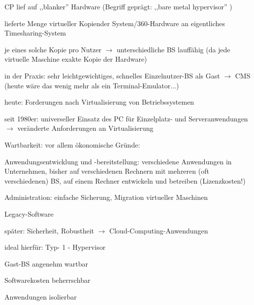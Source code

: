 \documentclass[a4paper]{article}
\newcommand{\cmark}{\ding{51}}
\begin{document}
\begin{multicols}{3}
\begin{itemize*}
\begin{itemize*}
            \item CP lief auf ,,blanker'' Hardware (Begriff geprägt: ,,bare metal hypervisor'' ) \begin{itemize*} \item   lieferte Menge virtueller Kopiender System/360-Hardware an   eigentliches Timesharing-System \item   je eines solche Kopie pro Nutzer $\rightarrow$    unterschiedliche BS lauffähig (da jede virtuelle Maschine exakte   Kopie der Hardware) \item   in der Praxis: sehr leichtgewichtiges, schnelles Einzelnutzer-BS   als Gast $\rightarrow$  CMS (heute wäre das wenig   mehr als ein Terminal-Emulator...) \end{itemize*}
        \end{itemize*}
        \item
        heute: Forderungen nach Virtualisierung von Betriebssystemen
        \begin{itemize*}
            \item seit 1980er: universeller Einsatz des PC für Einzelplatz- und Serveranwendungen $\rightarrow$  veränderte Anforderungen an Virtualisierung
            \item Wartbarkeit: vor allem ökonomische Gründe: \begin{enumerate*}  \item   Anwendungsentwicklung und -bereitstellung: verschiedene   Anwendungen in Unternehmen, bisher auf verschiedenen Rechnern mit   mehreren (oft verschiedenen) BS, auf einem Rechner entwickeln und   betreiben (Lizenzkosten!) \item   Administration: einfache Sicherung, Migration virtueller Maschinen \item   Legacy-Software \end{enumerate*}
            \item später: Sicherheit, Robustheit $\rightarrow$  Cloud-Computing-Anwendungen
        \end{itemize*}
        \item
        ideal hierfür: Typ- 1 - Hypervisor
        \begin{itemize*}
            \item \cmark  Gast-BS angenehm wartbar
            \item \cmark  Softwarekosten beherrschbar
            \item \cmark  Anwendungen isolierbar
        \end{itemize*}
    \end{itemize*}


\end{multicols}
\end{document}
